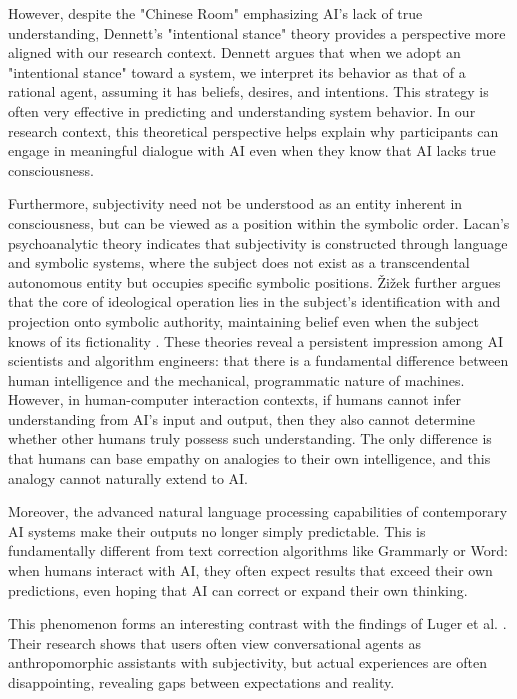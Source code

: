 \documentclass[sigchi,nonacm,manuscript]{acmart}
\begin{document}
However, despite the "Chinese Room" emphasizing AI's lack of true understanding, Dennett's "intentional stance" theory \citep{dennettIntentionalStance1998} provides a perspective more aligned with our research context. Dennett argues that when we adopt an "intentional stance" toward a system, we interpret its behavior as that of a rational agent, assuming it has beliefs, desires, and intentions. This strategy is often very effective in predicting and understanding system behavior. In our research context, this theoretical perspective helps explain why participants can engage in meaningful dialogue with AI even when they know that AI lacks true consciousness.

Furthermore, subjectivity need not be understood as an entity inherent in consciousness, but can be viewed as a position within the symbolic order. Lacan's psychoanalytic theory \citep{lacanEcritsFirstComplete2006} indicates that subjectivity is constructed through language and symbolic systems, where the subject does not exist as a transcendental autonomous entity but occupies specific symbolic positions. Žižek further argues that the core of ideological operation lies in the subject's identification with and projection onto symbolic authority, maintaining belief even when the subject knows of its fictionality \citep{zizekSublimeObjectIdeology2002}. These theories reveal a persistent impression among AI scientists and algorithm engineers: that there is a fundamental difference between human intelligence and the mechanical, programmatic nature of machines. However, in human-computer interaction contexts, if humans cannot infer understanding from AI's input and output, then they also cannot determine whether other humans truly possess such understanding. The only difference is that humans can base empathy on analogies to their own intelligence, and this analogy cannot naturally extend to AI.

Moreover, the advanced natural language processing capabilities of contemporary AI systems make their outputs no longer simply predictable. This is fundamentally different from text correction algorithms like Grammarly or Word: when humans interact with AI, they often expect results that exceed their own predictions, even hoping that AI can correct or expand their own thinking.

This phenomenon forms an interesting contrast with the findings of Luger et al. \citep{lugerHavingReallyBad2016}. Their research shows that users often view conversational agents as anthropomorphic assistants with subjectivity, but actual experiences are often disappointing, revealing gaps between expectations and reality.
\end{document}
